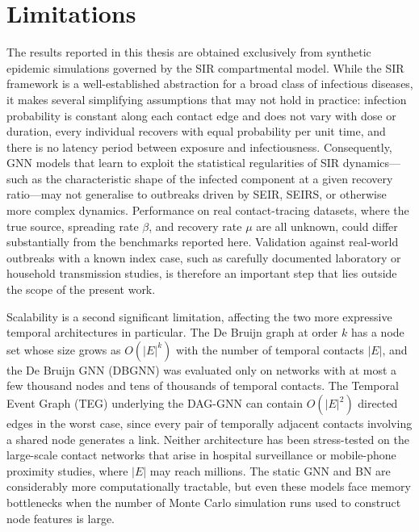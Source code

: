 \chapter{Limitations}
\label{c:limitations}

The results reported in this thesis are obtained exclusively from synthetic
epidemic simulations governed by the SIR compartmental model. While the SIR
framework is a well-established abstraction for a broad class of infectious
diseases, it makes several simplifying assumptions that may not hold in
practice: infection probability is constant along each contact edge and does
not vary with dose or duration, every individual recovers with equal probability
per unit time, and there is no latency period between exposure and
infectiousness. Consequently, GNN models that learn to exploit the statistical
regularities of SIR dynamics---such as the characteristic shape of the
infected component at a given recovery ratio---may not generalise to outbreaks
driven by SEIR, SEIRS, or otherwise more complex dynamics. Performance on real
contact-tracing datasets, where the true source, spreading rate $\beta$, and
recovery rate $\mu$ are all unknown, could differ substantially from the
benchmarks reported here. Validation against real-world outbreaks with a known
index case, such as carefully documented laboratory or household transmission
studies, is therefore an important step that lies outside the scope of the
present work.

Scalability is a second significant limitation, affecting the two more
expressive temporal architectures in particular. The De Bruijn graph at order
$k$ has a node set whose size grows as $O(|E|^k)$ with the number of temporal
contacts $|E|$, and the De Bruijn GNN (DBGNN) \cite{Qarkaxhija2022} was
evaluated only on networks with at most a few thousand nodes and tens of
thousands of temporal contacts. The Temporal Event Graph (TEG) underlying the
DAG-GNN can contain $O(|E|^2)$ directed edges in the worst case, since every
pair of temporally adjacent contacts involving a shared node generates a link.
Neither architecture has been stress-tested on the large-scale contact networks
that arise in hospital surveillance or mobile-phone proximity studies, where
$|E|$ may reach millions. The static GNN and BN are considerably more
computationally tractable, but even these models face memory bottlenecks when
the number of Monte Carlo simulation runs used to construct node features is
large.

